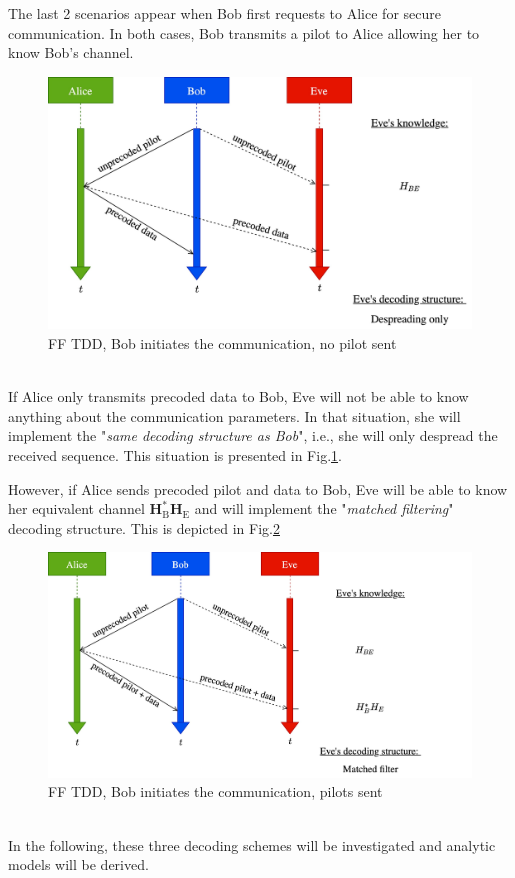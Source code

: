\documentclass[journal,comsoc]{IEEEtran}
\let\MYoriglatexcaption\caption
\renewcommand{\caption}[2][\relax]{\MYoriglatexcaption[#2]{#2}}
\newcommand{\HE}{\textbf{H}_{\text{E}}}
\newcommand{\HB}{\textbf{H}_{\text{B}}}
\begin{document}
The last 2 scenarios appear when Bob first requests to Alice for secure communication. In both cases, Bob transmits a pilot to Alice allowing her to know Bob's channel. \\
\begin{figure}[!ht]
	\centering
	\includegraphics[width=.9\linewidth]{graphs/diagram_sequence-FF_TDD_B_no_pilot.jpg}
	\caption{FF TDD, Bob initiates the communication, no pilot sent}
	\label{fig_ff_tdd_b_no_pilot}
\end{figure} \\
If Alice only transmits precoded data to Bob, Eve will not be able to know anything about the communication parameters. In that situation, she will implement the "\textit{same decoding structure as Bob}", i.e., she will only despread the received sequence. This situation is presented in Fig.\ref{fig_ff_tdd_b_no_pilot}.

However, if Alice sends precoded pilot and data to Bob, Eve will be able to know her equivalent channel $\HB^*\HE$ and will implement the "\textit{matched filtering}" decoding structure. This is depicted in Fig.\ref{fig_ff_tdd_b_pilot}
\begin{figure}[!ht]
	\centering
	\includegraphics[width=.95\linewidth]{graphs/diagram_sequence-FF_TDD_B_pilot.jpg}
	\caption{FF TDD, Bob initiates the communication, pilots sent}
	\label{fig_ff_tdd_b_pilot}
\end{figure}\\
In the following, these three decoding schemes will be investigated and analytic models will be derived.
\end{document}

